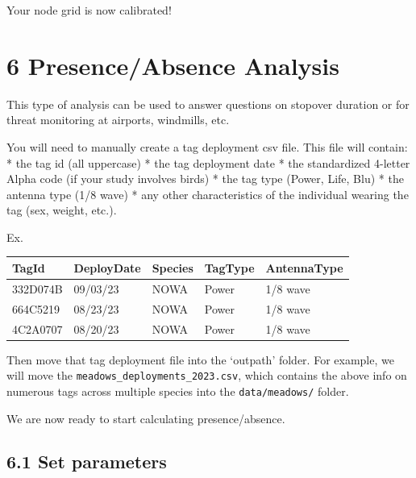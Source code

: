 \documentclass[
]{book}
\begin{document}
Your node grid is now calibrated!

\chapter{6 Presence/Absence Analysis}\label{presenceabsence-analysis}

This type of analysis can be used to answer questions on stopover duration or for threat monitoring at airports, windmills, etc.

You will need to manually create a tag deployment csv file. This file will contain:
* the tag id (all uppercase)
* the tag deployment date
* the standardized 4-letter Alpha code (if your study involves birds)
* the tag type (Power, Life, Blu)
* the antenna type (1/8 wave)
* any other characteristics of the individual wearing the tag (sex, weight, etc.).

Ex.

\begin{longtable}[]{@{}lllll@{}}
\toprule\noalign{}
TagId & DeployDate & Species & TagType & AntennaType \\
\midrule\noalign{}
\endhead
\bottomrule\noalign{}
\endlastfoot
332D074B & 09/03/23 & NOWA & Power & 1/8 wave \\
664C5219 & 08/23/23 & NOWA & Power & 1/8 wave \\
4C2A0707 & 08/20/23 & NOWA & Power & 1/8 wave \\
\end{longtable}

Then move that tag deployment file into the `outpath' folder. For example, we will move the \texttt{meadows\_deployments\_2023.csv}, which contains the above info on numerous tags across multiple species into the \texttt{data/meadows/} folder.

We are now ready to start calculating presence/absence.

\section{6.1 Set parameters}\label{set-parameters-1}
\end{document}
